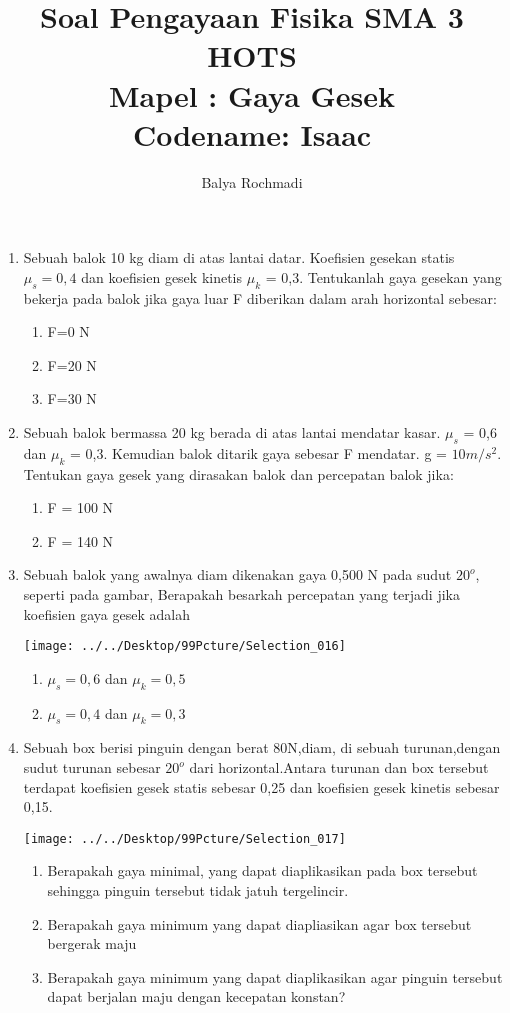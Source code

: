 \documentclass[12pt,a4paper,draft,final,oneside,twoside,openright,openany]{article}
\author{Balya Rochmadi}
\title{Soal Pengayaan Fisika SMA 3 HOTS\\ Mapel : Gaya Gesek\\Codename: Isaac}
\begin{document}
	\maketitle
	\Large
	\begin{enumerate}
		
		\item Sebuah balok 10 kg diam di atas lantai datar. Koefisien gesekan statis $\mu_s = 0,4$ dan koefisien gesek kinetis $\mu_k$ = 0,3. Tentukanlah gaya gesekan yang bekerja pada balok jika gaya luar F diberikan dalam arah horizontal sebesar:
		\begin{enumerate}
			\item F=0 N
			\item F=20 N
			\item F=30 N
		\end{enumerate}
		\item  Sebuah balok bermassa 20 kg berada di atas lantai mendatar kasar. $\mu_s$ = 0,6 dan $\mu_k$ = 0,3. Kemudian balok ditarik gaya sebesar F mendatar. g = $10 m/s^2$. Tentukan gaya gesek yang dirasakan balok dan percepatan balok jika:
		\begin{enumerate}
			\item F = 100 N
			\item F = 140 N
		\end{enumerate}
		\item Sebuah balok yang awalnya diam dikenakan gaya 0,500 N pada sudut $20^o$, seperti pada gambar, Berapakah besarkah percepatan yang terjadi jika koefisien gaya gesek adalah
		\begin{center}
			\texttt{[image: ../../Desktop/99Pcture/Selection\_016]}
		\end{center}
		\begin{enumerate}
			\item $\mu_s=0,6$ dan $\mu_k=0,5$
			\item $\mu_s=0,4$ dan $\mu_k=0,3$ 
		\end{enumerate}
		\item Sebuah box berisi pinguin dengan berat 80N,diam, di sebuah turunan,dengan sudut turunan sebesar $20^o$ dari horizontal.Antara turunan dan box tersebut terdapat koefisien gesek statis sebesar 0,25 dan koefisien gesek kinetis sebesar 0,15. 
		\begin{center}
				\texttt{[image: ../../Desktop/99Pcture/Selection\_017]}
		\end{center}
				
		 \begin{enumerate}
		 	\item  Berapakah gaya minimal, yang dapat diaplikasikan pada box tersebut sehingga pinguin tersebut tidak jatuh tergelincir.
		 	\item  Berapakah gaya minimum yang dapat diapliasikan agar box tersebut bergerak maju
		 	\item Berapakah gaya minimum yang dapat diaplikasikan agar pinguin tersebut dapat berjalan maju dengan kecepatan konstan?
		 \end{enumerate}
		 

\end{enumerate}
\end{document}
